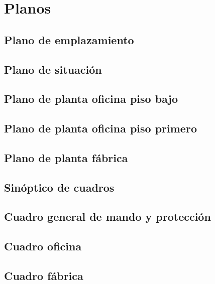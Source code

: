 \section{Planos}
\label{sec:Planos}

\subsection{Plano de emplazamiento}
\pagebreak 

\subsection{Plano de situación}
\pagebreak 

\subsection{Plano de planta oficina piso bajo}
\pagebreak 

\subsection{Plano de planta oficina piso primero}
\pagebreak 

\subsection{Plano de planta fábrica}
\pagebreak 

\subsection{Sinóptico de cuadros}
\pagebreak 

\subsection{Cuadro general de mando y protección}
\pagebreak 

\subsection{Cuadro oficina}
\pagebreak 

\subsection{Cuadro fábrica}
\pagebreak 